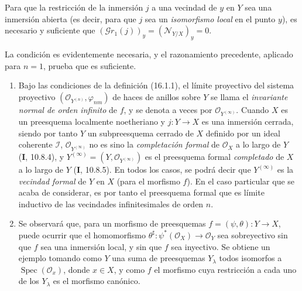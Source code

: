 \begin{corollary}[16.1.10]
\label{IV.16.1.10}
Para que la restricción de la inmersión $j$ a una vecindad de $y$ en $Y$ sea
una inmersión abierta \textup{(es decir, para que $j$ sea un \emph{isomorfismo local} en el
punto $y$)}, es necesario y suficiente que
$(\mathscr{G}r_1(j))_y=(\mathscr{N}_{Y/X})_y=0$.
\end{corollary}

La condición es evidentemente necesaria, y el razonamiento precedente, aplicado
para $n=1$, prueba que es suficiente.

\begin{remarks}[16.1.11]
\label{IV.16.1.11}
\begin{enumerate}
\item[(i)] Bajo las condiciones de la definición (16.1.1), el límite proyectivo
del sistema proyectivo
$(\mathcal{O}_{Y^{(n)}},\varphi_{nm})$ de haces de anillos sobre $Y$ se
llama el \emph{invariante normal de orden infinito} de $f$, y se denota a veces por
$\mathcal{O}_{Y^{(\infty)}}$. Cuando $X$ es un preesquema localmente
noetheriano y $j:Y\to X$ es una inmersión cerrada, siendo por tanto $Y$ un subpreesquema
cerrado de $X$ definido por un ideal coherente $\mathscr{I}$,
$\mathcal{O}_{Y^{(\infty)}}$ no es sino la \emph{completación formal} de
$\mathcal{O}_X$ a lo largo de $Y$ (\textbf I, 10.8.4), y
$Y^{(\infty)}=(Y,\mathcal{O}_{Y^{(\infty)}})$ es el preesquema formal \emph{completado} de
$X$ a lo largo de $Y$ (\textbf I, 10.8.5). En todos los casos, se podrá decir que
$Y^{(\infty)}$ es la \emph{vecindad formal} de $Y$ en $X$ (para el morfismo
$f$). En el caso particular que se acaba de considerar, es por tanto el preesquema
formal que es límite inductivo de las vecindades infinitesimales de orden $n$.
\item[(ii)] Se observará que, para un morfismo de preesquemas
$f=(\psi,\theta):Y\to X$, puede ocurrir que el homomorfismo
$\theta^\sharp:\psi^*(\mathcal{O}_X)\to\mathcal{O}_Y$ sea sobreyectivo sin que $f$
sea una inmersión
local, y sin que $f$ sea inyectivo. Se obtiene un ejemplo tomando como $Y$
una suma de preesquemas $Y_\lambda$ todos isomorfos a
$\operatorname{Spec}(\mathcal{O}_x)$, donde $x\in X$, y como $f$ el morfismo
cuya restricción a cada uno de los $Y_\lambda$ es el morfismo canónico.
\end{enumerate}
\end{remarks}
